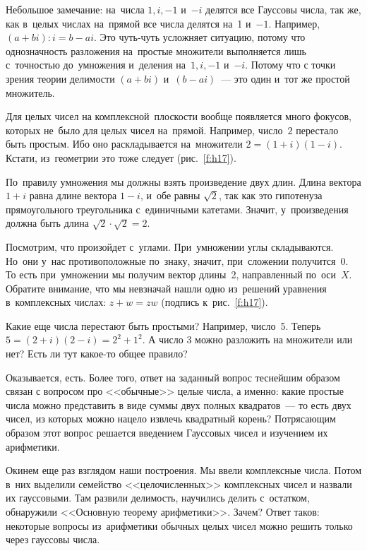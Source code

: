 Небольшое замечание: на~числа $1, i, -1$ и~$-i$ делятся все Гауссовы числа, так же, как в~целых числах
на~прямой все числа делятся на~1 и~$-1$.
 Например, $(a+bi):i=b-ai$. Это чуть-чуть усложняет ситуацию, потому
что однозначность разложения на~простые множители выполняется лишь с~точностью до~умножения и~деления
на~$1, i, -1$ и~$-i$. Потому что с точки зрения теории делимости $(a+bi)$ и~$(b-ai)$~--- это один
и~тот же простой множитель.

Для целых чисел на комплексной~плоскости вообще появляется много фокусов, которых не~было для целых
чисел на~прямой. Например, число~$2$ перестало быть простым. Ибо оно раскладывается на~множители
$2=(1+i)(1-i)$. Кстати, из~геометрии это тоже следует (рис.~\ref{f:h17}).




По~правилу умножения мы должны взять произведение двух длин. Длина вектора $1+i$ равна длине вектора
$1-i$, и~обе равны $\sqrt2$, так как это гипотенуза прямоугольного треугольника с~единичными катетами.
Значит, у~произведения должна быть длина $\sqrt2\cdot\sqrt2=2$.

Посмотрим, что произойдет с~углами. При~умножении углы складываются. Но~они у~нас противоположные
по~знаку, значит, при~сложении получится~0. То есть при~умножении мы получим вектор длины~2,
направленный по~оси~$X$. Обратите внимание, что мы невзначай нашли одно из~решений уравнения
в~комплексных числах: $z+w=zw$ (подпись к~рис.~\ref{f:h17}).

Какие еще числа перестают быть простыми? Например, число~5. Теперь
$
5 = (2+i)(2-i) =2^{2} +1^{2}.
$
А число $3$ можно разложить на множители или нет? Есть ли тут какое-то общее правило?

Оказывается, есть. Более того, ответ на заданный вопрос теснейшим образом связан с вопросом про
<<обычные>> целые числа, а именно: какие простые числа можно представить в виде суммы двух полных
квадратов~--- то есть двух чисел, из которых можно нацело извлечь квадратный корень? Потрясающим
образом этот вопрос решается введением Гауссовых чисел и изучением их арифметики.

Окинем еще раз взглядом наши построения. Мы ввели комплексные числа. Потом в~них выделили
семейство <<целочисленных>> комплексных чисел и назвали их гауссовыми. Там развили делимость,
научились делить с~остатком, обнаружили <<Основную теорему арифметики>>. Зачем? Ответ таков:
некоторые вопросы из~арифметики обычных целых чисел можно решить только через гауссовы числа.

